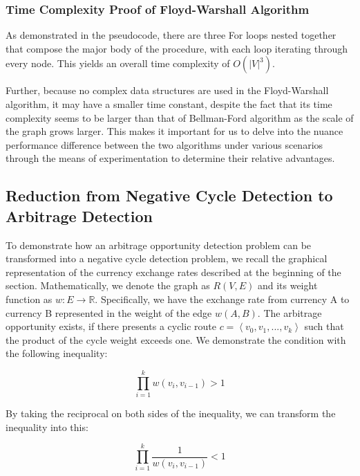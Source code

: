 \documentclass[12pt]{article}
\begin{document}
\subsubsection{Time Complexity Proof of Floyd-Warshall Algorithm}
As demonstrated in the pseudocode, there are three For loops nested together that compose the major body of the procedure, with each loop iterating through every node. This yields an overall time complexity of $O(|V|^3)$. 

\hspace*{\fill} %

Further, because no complex data structures are used in the Floyd-Warshall algorithm, it may have a smaller time constant, despite the fact that its time complexity seems to be larger than that of Bellman-Ford algorithm as the scale of the graph grows larger. This makes it important for us to delve into the nuance performance difference between the two algorithms under various scenarios through the means of experimentation to determine their relative advantages.

\subsection{Reduction from Negative Cycle Detection to Arbitrage Detection}

To demonstrate how an arbitrage opportunity detection problem can be transformed into a negative cycle detection problem, we recall the graphical representation of the currency exchange rates described at the beginning of the section. Mathematically, we denote the graph as $R(V, E)$ and its weight function as $w: E \rightarrow \mathbb{R}$. Specifically, we have the exchange rate from currency A to currency B represented in the weight of the edge $w(A, B)$. The arbitrage opportunity exists, if there presents a cyclic route $c = \left\langle v_0, v_1,...,v_k\right\rangle$ such that the product of the cycle weight exceeds one. We demonstrate the condition with the following inequality:

\begin{equation}
    \prod^{k}_{i=1} w(v_i, v_{i-1}) > 1
\end{equation}

By taking the reciprocal on both sides of the inequality, we can transform the inequality into this:

\begin{equation}
    \prod^{k}_{i=1} \frac{1}{w(v_i, v_{i-1})} < 1
\end{equation}
\end{document}
